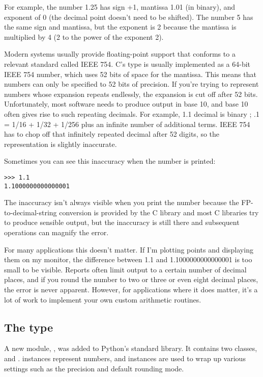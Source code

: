 \documentclass{howto}
\begin{document}
For example, the number 1.25 has sign +1, mantissa 1.01 (in binary),
and exponent of 0 (the decimal point doesn't need to be shifted).  The
number 5 has the same sign and mantissa, but the exponent is 2
because the mantissa is multiplied by 4 (2 to the power of the exponent 2).

Modern systems usually provide floating-point support that conforms to
a relevant standard called IEEE 754.  C's  type is
usually implemented as a 64-bit IEEE 754 number, which uses 52 bits of
space for the mantissa.  This means that numbers can only be specified
to 52 bits of precision.  If you're trying to represent numbers whose
expansion repeats endlessly, the expansion is cut off after 52 bits.
Unfortunately, most software needs to produce output in base 10, and
base 10 often gives rise to such repeating decimals.  For example, 1.1
decimal is binary ; .1 = 1/16 + 1/32 + 1/256
plus an infinite number of additional terms.  IEEE 754 has to chop off
that infinitely repeated decimal after 52 digits, so the
representation is slightly inaccurate.  

Sometimes you can see this inaccuracy when the number is printed:
\begin{verbatim}
>>> 1.1
1.1000000000000001
\end{verbatim}

The inaccuracy isn't always visible when you print the number because
the FP-to-decimal-string conversion is provided by the C library and
most C libraries try to produce sensible output, but the inaccuracy is
still there and subsequent operations can magnify the error.

For many applications this doesn't matter.  If I'm plotting points and
displaying them on my monitor, the difference between 1.1 and
1.1000000000000001 is too small to be visible.  Reports often limit
output to a certain number of decimal places, and if you round the
number to two or three or even eight decimal places, the error is
never apparent.  However, for applications where it does matter, 
it's a lot of work to implement your own custom arithmetic routines.

\subsection{The  type}

A new module, , was added to Python's standard library.
It contains two classes,  and .
 instances represent numbers, and
 instances are used to wrap up various settings such as the precision and default rounding mode.
\end{document}
